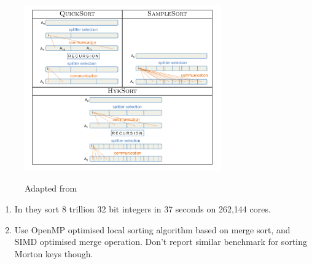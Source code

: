 \begin{frame}
    \begin{figure}
        \centering
        \includegraphics[width=8.5cm]{assets/hyksort.png}
        \label{fig:hyksort}
        \caption{Adapted from \cite{Sundar2013}}
    \end{figure}
\end{frame}

\begin{frame}
    \begin{enumerate}
        \item In \cite{Sundar2013} they sort 8 trillion 32 bit integers in 37 seconds on 262,144 cores.
        \item Use OpenMP optimised local sorting algorithm based on merge sort, and SIMD optimised merge operation. Don't report similar benchmark for sorting Morton keys though.
    \end{enumerate}
\end{frame}